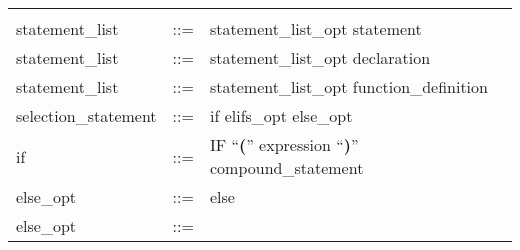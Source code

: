 \documentclass[11pt]{article}
\begin{document}
\begin{longtable}{lrl}
\begin{minipage}[t]{\rulerhs}
  \end{minipage}                                                             \\
statement\_list                            & ::= &
  \begin{minipage}[t]{\rulerhs}
    \raggedright
    statement\_list\_opt statement
  \end{minipage}                                                             \\
statement\_list                            & ::= &
  \begin{minipage}[t]{\rulerhs}
    \raggedright
    statement\_list\_opt declaration
  \end{minipage}                                                             \\
statement\_list                            & ::= &
  \begin{minipage}[t]{\rulerhs}
    \raggedright
    statement\_list\_opt function\_definition
  \end{minipage}                                                             \\
selection\_statement                       & ::= &
  \begin{minipage}[t]{\rulerhs}
    \raggedright
    if elifs\_opt else\_opt
  \end{minipage}                                                             \\
if                                         & ::= &
  \begin{minipage}[t]{\rulerhs}
    \raggedright
    IF ``{\bf (}'' expression ``{\bf )}'' compound\_statement
  \end{minipage}                                                             \\
else\_opt                                  & ::= &
  \begin{minipage}[t]{\rulerhs}
    \raggedright
    else
  \end{minipage}                                                             \\
else\_opt                                  & ::= &
  \begin{minipage}[t]{\rulerhs}
    \raggedright
    

\end{minipage}
\end{longtable}
\end{document}
